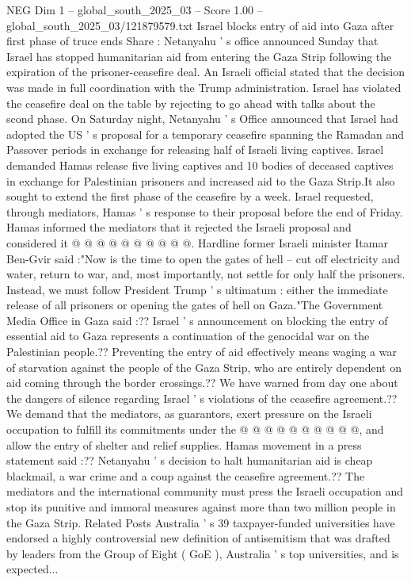 \begin{textsample}{NEG Dim 1 – global\_south\_2025\_03 – Score 1.00 – global\_south\_2025\_03/121879579.txt}  \label{ex:f1_neg_165}
Israel blocks entry of aid into Gaza after first phase of truce ends Share : Netanyahu ' s office announced Sunday that Israel has stopped humanitarian aid from entering the Gaza Strip following the expiration of the prisoner-ceasefire deal.
An Israeli official stated that the decision was made in full coordination with the Trump administration.
Israel has violated the ceasefire deal on the table by rejecting to go ahead with talks about the scond phase.
On Saturday night, Netanyahu ' s Office announced that Israel had adopted the US ' s proposal for a temporary ceasefire spanning the Ramadan and Passover periods in exchange for releasing half of Israeli living captives.
Israel demanded Hamas release five living captives and 10 bodies of deceased captives in exchange for Palestinian prisoners and increased aid to the Gaza Strip.It also sought to extend the first phase of the ceasefire by a week.
Israel requested, through mediators, Hamas ' s response to their proposal before the end of Friday.
Hamas informed the mediators that it rejected the Israeli proposal and considered it @ @ @ @ @ @ @ @ @ @.
Hardline former Israeli minister Itamar Ben-Gvir said :"Now is the time to open the gates of hell -- cut off electricity and water, return to war, and, most importantly, not settle for only half the prisoners.
Instead, we must follow President Trump ' s ultimatum : either the immediate release of all prisoners or opening the gates of hell on Gaza."The Government Media Office in Gaza said :??
Israel ' s announcement on blocking the entry of essential aid to Gaza represents a continuation of the genocidal war on the Palestinian people.??
Preventing the entry of aid effectively means waging a war of starvation against the people of the Gaza Strip, who are entirely dependent on aid coming through the border crossings.??
We have warned from day one about the dangers of silence regarding Israel ' s violations of the ceasefire agreement.??
We demand that the mediators, as guarantors, exert pressure on the Israeli occupation to fulfill its commitments under the @ @ @ @ @ @ @ @ @ @, and allow the entry of shelter and relief supplies.
Hamas movement in a press statement said :??
Netanyahu ' s decision to halt humanitarian aid is cheap blackmail, a war crime and a coup against the ceasefire agreement.??
The mediators and the international community must press the Israeli occupation and stop its punitive and immoral measures against more than two million people in the Gaza Strip.
Related Posts Australia ' s 39 taxpayer-funded universities have endorsed a highly controversial new definition of antisemitism that was drafted by leaders from the Group of Eight ( GoE ), Australia ' s top universities, and is expected...

\end{textsample}
